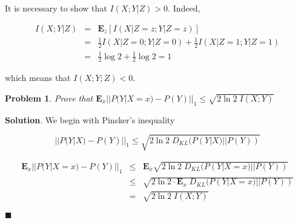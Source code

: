 \documentclass[12pt]{article}
\newtheorem{p}{Problem}[section]
\theoremstyle{definition}
\newenvironment{s}{%
        \begin{trivlist} \item \textbf{Solution}. }{%
            \hspace*{\fill} $\blacksquare$\end{trivlist}}%
\begin{document}
{It is necessary to show that $I(X;Y|Z) > 0$. Indeed,

\begin{eqnarray*}
I(X;Y|Z) &=& \mathbf{E}_{z}[I(X|Z=z; Y|Z=z)]\\
&=& \frac{1}{2}I(X|Z=0; Y|Z=0) + \frac{1}{2}I(X|Z=1; Y|Z=1)\\
&=& \frac{1}{2}\log 2 + \frac{1}{2} \log 2 = 1
\end{eqnarray*}

which means that $I(X;Y;Z) < 0$.

\begin{p}
Prove that $\mathbf{E}_{x}||P(Y|X=x) - P(Y)||_{1} \leq \sqrt{2\ln 2 \;I(X;Y)}$
\end{p}

\begin{s}
We begin with Pinsker's inequality

\begin{equation*}
||P(Y|X)-P(Y)||_{1} \leq \sqrt{2\ln 2 \; D_{KL}(P(Y|X)||P(Y))}
\end{equation*}

\begin{eqnarray*}
\mathbf{E}_{x}||P(Y|X=x) - P(Y)||_{1} &\leq & \mathbf{E}_{x}\sqrt{2\ln 2 \;D_{KL}(P(Y|X=x)||P(Y))}\\
&\leq & \sqrt{2\ln 2 \cdot \mathbf{E}_{x}\; D_{KL}(P(Y|X=x)||P(Y))}\\
&=& \sqrt{2\ln 2 \;I(X;Y)}
\end{eqnarray*}

\end{s}
\end{document}
